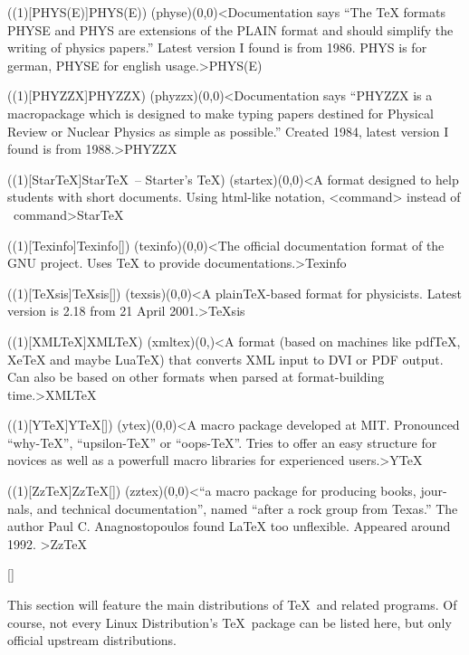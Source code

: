 \tograph(\tostruct(1)[PHYS(E)]{PHYS(E)}){
	\tonode(physe)(0,0)<Documentation says “The TeX formats PHYSE and PHYS are extensions of the PLAIN format
and should simplify the writing of physics papers.” Latest version I found is from 1986. PHYS is for german, PHYSE for english usage.>{PHYS(E)}
}

\tograph(\tostruct(1)[PHYZZX]{PHYZZX}){
	\tonode(phyzzx)(0,0)<Documentation says “PHYZZX is a macropackage which is designed to make typing papers destined for Physical Review or Nuclear Physics as simple as possible.” Created 1984, latest version I found is from 1988.>{PHYZZX}
}

\tograph(\tostruct(1)[Star\TeX]{Star\TeX\ – Starter's \TeX}){
	\tonode(startex)(0,0)<A format designed to help students with short documents. Using html-like notation, <command> instead of \ command>{Star\TeX}
}

\tograph(\tostruct(1)[Texinfo]{Texinfo}[\normalimportant]){
	\tonode(texinfo)(0,0)<The official documentation format of the GNU project. Uses TeX to provide documentations.>{Texinfo}
}

\tograph(\tostruct(1)[TeXsis]{\TeX sis}[\normalimportant]){
	\tonode(texsis)(0,0)<A plainTeX-based format for physicists. Latest version is 2.18 from 21 April 2001.>{\TeX sis}
}

\tograph(\tostruct(1)[XML\TeX]{XML\TeX}){
  \tonode(xmltex)(0,\layer)<A format (based on machines like pdfTeX, XeTeX and maybe LuaTeX) that converts XML input to DVI or PDF output. Can also be based on other formats when parsed at format-building time.>{XML\TeX}
}

\tograph(\tostruct(1)[Y\TeX]{Y\TeX}[\experimental]){
	\tonode(ytex)(0,0)<A macro package developed at MIT. Pronounced “why-TeX”, “upsilon-TeX” or “oops-TeX”. Tries to offer an easy structure for novices as well as a powerfull macro libraries for experienced users.>{Y\TeX}
}

\tograph(\tostruct(1)[Zz\TeX]{Zz\TeX}[\normalimportant]){
	\tonode(zztex)(0,0)<“a macro package for producing books, jour-
nals, and technical documentation”, named “after a rock group from Texas.” The author Paul C. Anagnostopoulos found LaTeX too unflexible. Appeared around 1992.
>{Zz\TeX}
}

\clearpage

[\distro]
\parbox{\textwidth}{\normalsize
This section will feature the main distributions of \TeX\ and related programs. Of course, not every Linux Distribution's \TeX\ package can be listed here, but only official upstream distributions.
}

